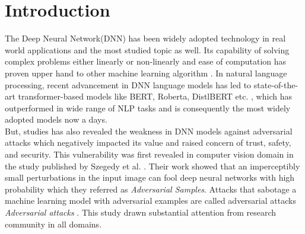 \documentclass[%
	BCOR=8mm, %
	DIV=12,
	toc=bibliography, %
	toc=listof, %
	oneside, %
	egregdoesnotlikesansseriftitles, %
	]{scrbook}
\begin{document}







\tableofcontents
\listoffigures
\listoftables

% 
\newpage


\pagestyle{headings}
\setcapindent{0pt}



\chapter{Introduction}
The Deep Neural Network(DNN) has been widely  adopted technology in real world applications and the most studied topic as well. Its capability of solving complex problems either linearly or non-linearly and ease of computation has proven upper hand to other machine learning algorithm \cite{huq_adversarial_2020}. In natural language processing, recent advancement in DNN  language models  has led to state-of-the-art transformer-based models like BERT, Roberta, DistlBERT etc. \cite{devlin_bert_2019-1,liu_roberta_2019-1,sanh_distilbert_2020,lan_albert_2020}, which has outperformed in wide range of NLP tasks  and is consequently the most widely adopted models now a days.\\
But,  studies has also revealed the weakness in DNN models against adversarial attacks \cite{szegedy_intriguing_2014,yuan_adversarial_2018,akhtar_threat_2018,huq_adversarial_2020,zhang_adversarial_2019} which negatively impacted its value and raised concern of trust, safety, and security. This vulnerability was first revealed in computer vision domain in the study published by Szegedy et al. \cite{szegedy_intriguing_2014}. Their work showed that  an imperceptibly small perturbations in the input image can fool deep neural networks with high probability which they referred  as \textit{Adversarial Samples}. Attacks that sabotage a machine learning model with adversarial examples are called adversarial attacks \textit{Adversarial attacks} \cite{nicolae_adversarial_2019}. This study drawn substantial attention from research community in all domains. \\
\end{document}
